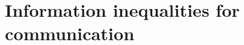 \chapter{Information inequalities for communication}
\label{chapter:communication-information}





